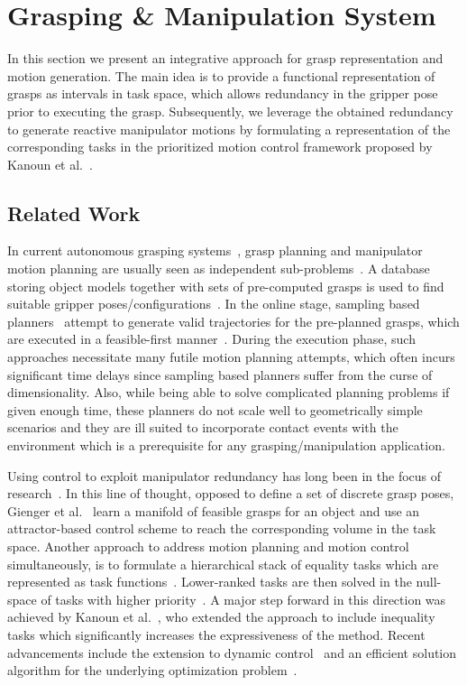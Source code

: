 \section{Grasping \& Manipulation System}
\label{sec:manip}
%
In this section we present an integrative approach for grasp representation and motion
generation. The main idea is to provide a functional representation of grasps as intervals in task
space, which allows redundancy in the gripper pose prior to executing the grasp. Subsequently, we
leverage the obtained redundancy to generate reactive manipulator motions by formulating a
representation of the corresponding tasks in the prioritized motion control framework proposed by
Kanoun et al.~\cite{Kano11}.
%
\subsection{Related Work}
\label{subsec:Grasping_related_work}
%
In current autonomous grasping systems~\cite{Bere07, Srin10, Krug14a}, grasp planning and
manipulator motion planning are usually seen as independent sub-problems~\cite{Dian10}. A database
storing object models together with sets of pre-computed grasps is used to find suitable gripper
poses/configurations~\cite{Mill04, Gold11, Krug14a}. In the online stage, sampling based
planners~\cite{LaVa06} attempt to generate valid trajectories for the pre-planned grasps, which are
executed in a feasible-first manner~\cite{Bere07}. During the execution phase, such approaches
necessitate many futile motion planning attempts, which often incurs significant time delays since
sampling based planners suffer from the curse of dimensionality. Also, while being able to solve
complicated planning problems if given enough time, these planners do not scale well to
geometrically simple scenarios and they are ill suited to incorporate contact events with the
environment which is a prerequisite for any grasping/manipulation application.

Using control to exploit manipulator redundancy has long been in the focus of research~\cite{Sici91,
  Sent10}. In this line of thought, opposed to define a set of discrete grasp poses, Gienger et
al.~\cite{Gien08a, Gien08b} learn a manifold of feasible grasps for an object and use an
attractor-based control scheme to reach the corresponding volume in the task space. Another approach
to address motion planning and motion control simultaneously, is to formulate a hierarchical stack
of equality tasks which are represented as task functions~\cite{Sams91}. Lower-ranked tasks are then
solved in the null-space of tasks with higher priority~\cite{Sici91, Sent10}. A major step forward
in this direction was achieved by Kanoun et al.~\cite{Kano11}, who extended the approach to include
inequality tasks which significantly increases the expressiveness of the method. Recent advancements
include the extension to dynamic control~\cite{Saab13} and an efficient solution algorithm for the
underlying optimization problem~\cite{Esca14}.
%
